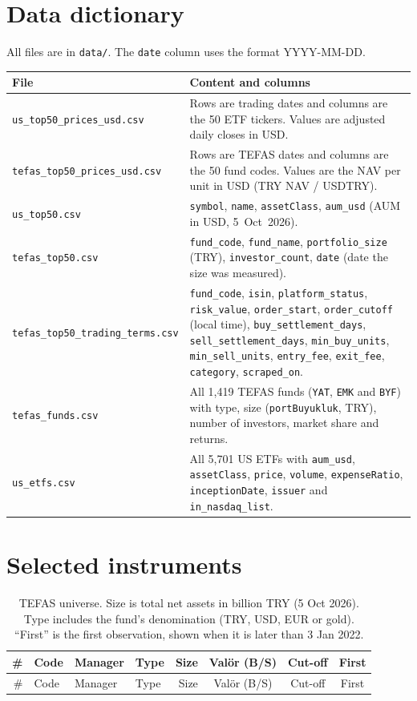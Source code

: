 \documentclass[11pt,a4paper]{article}
\newcommand{\code}[1]{\texttt{\small #1}}
\begin{document}
\section{Data dictionary}
All files are in \code{data/}. The \code{date} column uses the format YYYY-MM-DD.
\begin{table}[h]
\centering\small
\begin{tabularx}{\linewidth}{@{}lX@{}}
\toprule
\textbf{File} & \textbf{Content and columns}\\
\midrule
\code{us\_top50\_prices\_usd.csv} & Rows are trading dates and columns are the 50 ETF tickers. Values are adjusted daily closes in USD.\\
\code{tefas\_top50\_prices\_usd.csv} & Rows are TEFAS dates and columns are the 50 fund codes. Values are the NAV per unit in USD (TRY NAV / USDTRY).\\
\code{us\_top50.csv} & \code{symbol}, \code{name}, \code{assetClass}, \code{aum\_usd} (AUM in USD, 5~Oct~2026).\\
\code{tefas\_top50.csv} & \code{fund\_code}, \code{fund\_name}, \code{portfolio\_size} (TRY), \code{investor\_count}, \code{date} (date the size was measured).\\
\code{tefas\_top50\_trading\_terms.csv} & \code{fund\_code}, \code{isin}, \code{platform\_status}, \code{risk\_value}, \code{order\_start}, \code{order\_cutoff} (local time), \code{buy\_settlement\_days}, \code{sell\_settlement\_days}, \code{min\_buy\_units}, \code{min\_sell\_units}, \code{entry\_fee}, \code{exit\_fee}, \code{category}, \code{scraped\_on}.\\
\code{tefas\_funds.csv} & All 1{,}419 TEFAS funds (\code{YAT}, \code{EMK} and \code{BYF}) with type, size (\code{portBuyukluk}, TRY), number of investors, market share and returns.\\
\code{us\_etfs.csv} & All 5{,}701 US ETFs with \code{aum\_usd}, \code{assetClass}, \code{price}, \code{volume}, \code{expenseRatio}, \code{inceptionDate}, \code{issuer} and \code{in\_nasdaq\_list}.\\
\bottomrule
\end{tabularx}
\end{table}

\appendix
\section{Selected instruments}\label{app:lists}
\small
\begin{longtable}{@{}rlllrccc@{}}
\caption{TEFAS universe. Size is total net assets in billion TRY (5 Oct 2026). Type includes the fund's denomination (TRY, USD, EUR or gold). ``First'' is the first observation, shown when it is later than 3 Jan 2022.}\\
\toprule
\# & Code & Manager & Type & Size & Valör (B/S) & Cut-off & First\\
\midrule\endfirsthead
\toprule
\# & Code & Manager & Type & Size & Valör (B/S) & Cut-off & First\\
\midrule\endhead
\bottomrule
\end{longtable}
\end{document}
